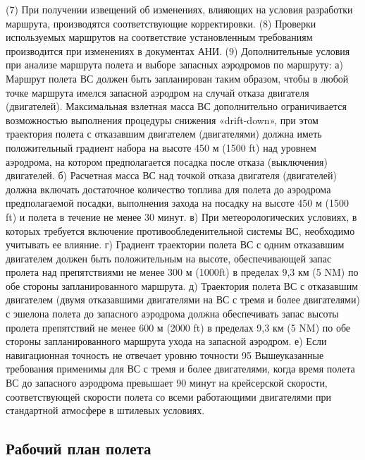 (7) При получении извещений об изменениях, влияющих на условия разработки маршрута, производятся соответствующие корректировки.
(8) Проверки используемых маршрутов на соответствие установленным требованиям производится при изменениях в документах АНИ.
(9) Дополнительные условия при анализе маршрута полета и выборе запасных аэродромов по маршруту: 
а)	Маршрут полета ВС должен быть запланирован таким образом, чтобы в любой точке маршрута имелся запасной аэродром на случай отказа двигателя (двигателей). Максимальная взлетная масса ВС дополнительно ограничивается возможностью выполнения процедуры снижения «drift-down», при этом траектория полета с отказавшим двигателем (двигателями) должна иметь положительный градиент набора на высоте 450 м (1500 ft) над уровнем аэродрома, на котором предполагается посадка после отказа (выключения) двигателей.
б)	Расчетная масса ВС над точкой отказа двигателя (двигателей) должна включать достаточное количество топлива для полета до аэродрома предполагаемой посадки, выполнения захода на посадку на высоте 450 м (1500 ft) и полета в течение не менее 30 минут.
в)	При метеорологических условиях, в которых требуется включение противообледенительной системы ВС, необходимо учитывать ее влияние.
г)	Градиент траектории полета ВС с одним отказавшим двигателем должен быть положительным на высоте, обеспечивающей запас пролета над препятствиями не менее 300 м (1000ft) в пределах 9,3 км (5 NM) по обе стороны запланированного маршрута.
д)	Траектория полета ВС с отказавшим двигателем (двумя отказавшими двигателями на ВС с тремя и более двигателями) с эшелона полета до запасного аэродрома должна обеспечивать запас высоты пролета препятствий не менее 600 м (2000 ft) в пределах 9,3 км (5 NM) по обе стороны запланированного маршрута ухода на запасной аэродром.
е)	Если навигационная точность не отвечает уровню точности 95%
Вышеуказанные требования применимы для ВС с тремя и более двигателями, когда время полета ВС до запасного аэродрома превышает 90 минут на крейсерской скорости, соответствующей скорости полета со всеми работающими двигателями при стандартной атмосфере в штилевых условиях.

\subsection{Рабочий план полета}

